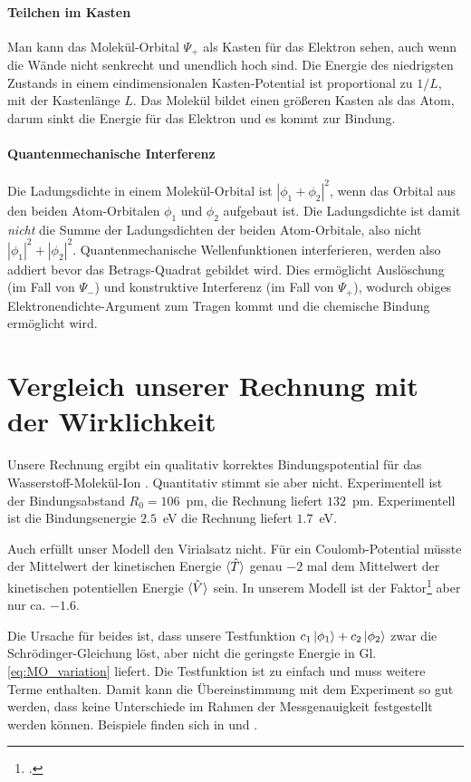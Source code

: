 \paragraph{Teilchen im Kasten}  Man kann das Molekül-Orbital $\Psi_+$ als Kasten für das Elektron sehen, auch wenn die Wände nicht senkrecht und unendlich hoch sind. Die Energie des niedrigsten Zustands in einem eindimensionalen  Kasten-Potential ist proportional zu $1/L$, mit der Kastenlänge $L$. Das Molekül bildet einen größeren Kasten als das Atom, darum sinkt die Energie für das Elektron und es kommt zur Bindung.

\paragraph{Quantenmechanische Interferenz} Die Ladungsdichte in einem Molekül-Orbital ist $| \phi_1 + \phi_2 |^2$, wenn das Orbital aus den beiden Atom-Orbitalen $\phi_1$ und $\phi_2$ aufgebaut ist. Die Ladungsdichte ist damit \emph{nicht} die Summe der Ladungsdichten der beiden Atom-Orbitale, also nicht $| \phi_1 |^2 +| \phi_2 |^2$. Quantenmechanische Wellenfunktionen interferieren, werden also addiert bevor das Betrags-Quadrat gebildet wird. Dies ermöglicht Auslöschung (im Fall von $\Psi_-$) und konstruktive Interferenz (im Fall von $\Psi_+$), wodurch obiges Elektronendichte-Argument zum Tragen kommt und  die chemische Bindung ermöglicht wird.


\section{Vergleich unserer Rechnung mit der Wirklichkeit}

Unsere Rechnung ergibt ein qualitativ korrektes Bindungspotential für das  Wasserstoff-Molekül-Ion  . Quantitativ stimmt sie aber nicht. Experimentell ist der Bindungsabstand $R_0 = 106$~pm, die Rechnung liefert $132$~pm. Experimentell ist die Bindungsenergie $2.5$~eV die Rechnung liefert $1.7$~eV.

Auch erfüllt unser Modell den Virialsatz nicht. Für ein Coulomb-Potential müsste der Mittelwert der kinetischen Energie $\braket{\hat{T}}$ genau $-2$ mal dem Mittelwert der kinetischen potentiellen Energie $\braket{\hat{V}}$ sein. In unserem Modell ist der Faktor\footcite{McQuarrie2008} aber nur ca. $-1.6$.

Die Ursache für beides ist, dass unsere Testfunktion $c_1 \ket{\phi_1} + c_2 \ket{\phi_2}$ zwar die Schrödinger-Gleichung löst, aber nicht die geringste Energie in Gl. \ref{eq:MO_variation} liefert. Die Testfunktion ist zu einfach und muss weitere Terme enthalten. Damit kann die Übereinstimmung mit dem Experiment so gut werden, dass keine Unterschiede im Rahmen der Messgenauigkeit festgestellt werden können. Beispiele finden sich in \cite{McQuarrie2008} und \cite{Demtröder_AMP} .


\printbibliography[segment=\therefsegment,heading=subbibliography]

